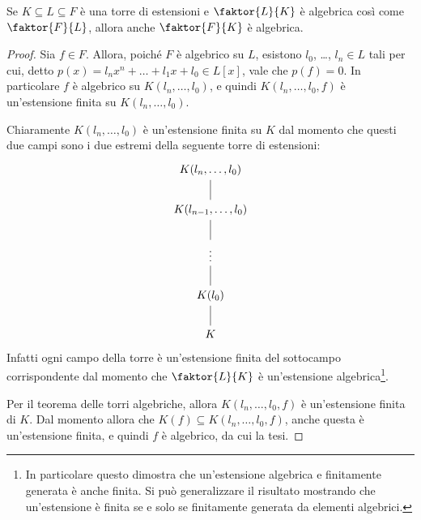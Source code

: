 \documentclass[12pt]{scrartcl}
\begin{document}
	\begin{proposition}
		Se $K \subseteq L \subseteq F$ è una torre di
		estensioni e $\faktor{L}{K}$ è algebrica così
		come $\faktor{F}{L}$, allora anche
		$\faktor{F}{K}$ è algebrica.
	\end{proposition}

	\begin{proof}
		Sia $f \in F$. Allora, poiché $F$ è
		algebrico su $L$, esistono $l_0$, \ldots,
		$l_n \in L$ tali per cui, detto
		$p(x) = l_n x^n + \ldots + l_1 x + l_0 \in L[x]$,
		vale che $p(f) = 0$. In particolare $f$ è
		algebrico su $K(l_n, \ldots, l_0)$, e quindi
		$K(l_n, \ldots, l_0, f)$ è un'estensione finita
		su $K(l_n, \ldots, l_0)$. \medskip
		
		
		Chiaramente $K(l_n, \ldots, l_0)$ è un'estensione
		finita su $K$ dal momento che questi due campi sono
		i due estremi della seguente torre di estensioni:
		\[\begin{tikzcd}
			{K(l_n, \ldots, l_0)} \\
			{K(l_{n-1}, \ldots, l_0) } \\
			\vdots \\
			{K(l_0)} \\
			K
			\arrow[no head, from=1-1, to=2-1]
			\arrow[no head, from=2-1, to=3-1]
			\arrow[no head, from=3-1, to=4-1]
			\arrow[no head, from=4-1, to=5-1]
		\end{tikzcd}\]
		Infatti ogni campo della torre è un'estensione
		finita del sottocampo corrispondente dal momento
		che $\faktor{L}{K}$ è un'estensione algebrica\footnote{
			In particolare questo dimostra che un'estensione
			algebrica e finitamente generata è anche
			finita. Si può generalizzare il risultato
			mostrando che un'estensione è finita se e solo
			se finitamente generata da elementi algebrici.
		}. \medskip
		
		
		Per il teorema delle torri algebriche, allora
		$K(l_n, \ldots, l_0, f)$ è un'estensione finita
		di $K$. Dal momento allora che $K(f) \subseteq K(l_n, \ldots, l_0, f)$, anche questa è un'estensione finita,
		e quindi $f$ è algebrico, da cui la tesi.
	\end{proof}
\end{document}
